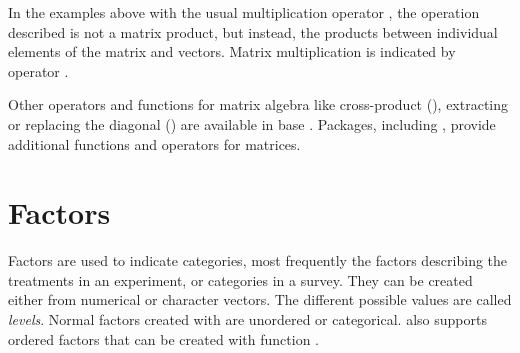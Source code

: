 \documentclass[krantz2]{krantz}\usepackage{knitr}
\begin{document}
In the examples above with the usual multiplication operator \code{*}, the operation described is not a matrix product, but instead, the products between individual elements of the matrix and vectors. Matrix multiplication is indicated by operator \Roperator{\%*\%}.

\begin{knitrout}\footnotesize
{}\color{fgcolor}
\end{knitrout}

Other operators and functions for matrix algebra like cross-product (), extracting or replacing the diagonal () are available in base \Rlang. Packages, including , provide additional functions and operators for matrices.




\section{Factors}\label{sec:calc:factors}
Factors are used to indicate categories, most frequently the factors describing the treatments in an experiment, or categories in a survey. They can be created either from numerical or character vectors. The different possible values are called \emph{levels}. Normal factors created with  are unordered or categorical. \Rlang also supports ordered factors that can be created with function .
\end{document}
